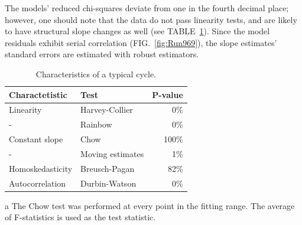 \documentclass[reprint]{revtex4-1}
\begin{document}
The models' reduced chi-squares deviate from one in the fourth decimal place; however, one should note that the data do not pass linearity tests, and are likely to have structural slope changes as well (see TABLE~\ref{tbl:CycleChars}). Since the model residuals exhibit serial correlation (FIG.~\ref{fig:Run969}), the slope estimates' standard errors are estimated with robust estimators.

\begin{table}
\centering
\begin{threeparttable}
	\caption{Characteristics of a typical cycle.\label{tbl:CycleChars}}
	\begin{tabular}{llr}
	\hline\hline
	Charactetistic	& Test 					& P-value \\
	\hline
	Linearity 		& Harvey-Collier		& 0\% \\
	-				& Rainbow				& 0\% \\
	Constant slope	& Chow\tnote{a}		 	& 100\% \\
	-				& Moving estimates		& 1\% \\
	Homoskedasticity& Breusch-Pagan 		& 82\% \\
	Autocorrelation & Durbin-Watson			& 0\% \\
	\hline\hline
	\end{tabular}
	\begin{tablenotes}
	\item[a]{The Chow test was performed at every point in the fitting range. The average of F-statistics is used as the test statistic.}
	\end{tablenotes}
\end{threeparttable}
\end{table}
\end{document}
